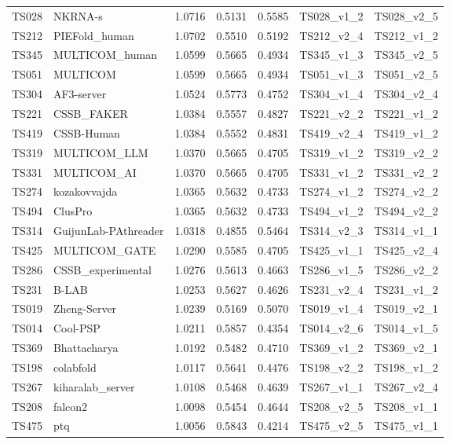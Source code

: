 \begin{table}[ht]
{\begin{tabular}{llrrrll}
TS028 & NKRNA-s & 1.0716 & 0.5131 & 0.5585 & TS028\_v1\_2 & TS028\_v2\_5 \\ 
TS212 & PIEFold\_human & 1.0702 & 0.5510 & 0.5192 & TS212\_v2\_4 & TS212\_v1\_2 \\ 
TS345 & MULTICOM\_human & 1.0599 & 0.5665 & 0.4934 & TS345\_v1\_3 & TS345\_v2\_5 \\ 
TS051 & MULTICOM & 1.0599 & 0.5665 & 0.4934 & TS051\_v1\_3 & TS051\_v2\_5 \\ 
TS304 & AF3-server & 1.0524 & 0.5773 & 0.4752 & TS304\_v1\_4 & TS304\_v2\_4 \\ 
TS221 & CSSB\_FAKER & 1.0384 & 0.5557 & 0.4827 & TS221\_v2\_2 & TS221\_v1\_2 \\ 
TS419 & CSSB-Human & 1.0384 & 0.5552 & 0.4831 & TS419\_v2\_4 & TS419\_v1\_2 \\ 
TS319 & MULTICOM\_LLM & 1.0370 & 0.5665 & 0.4705 & TS319\_v1\_2 & TS319\_v2\_2 \\ 
TS331 & MULTICOM\_AI & 1.0370 & 0.5665 & 0.4705 & TS331\_v1\_2 & TS331\_v2\_2 \\ 
TS274 & kozakovvajda & 1.0365 & 0.5632 & 0.4733 & TS274\_v1\_2 & TS274\_v2\_2 \\ 
TS494 & ClusPro & 1.0365 & 0.5632 & 0.4733 & TS494\_v1\_2 & TS494\_v2\_2 \\ 
TS314 & GuijunLab-PAthreader & 1.0318 & 0.4855 & 0.5464 & TS314\_v2\_3 & TS314\_v1\_1 \\ 
TS425 & MULTICOM\_GATE & 1.0290 & 0.5585 & 0.4705 & TS425\_v1\_1 & TS425\_v2\_4 \\ 
TS286 & CSSB\_experimental & 1.0276 & 0.5613 & 0.4663 & TS286\_v1\_5 & TS286\_v2\_2 \\ 
TS231 & B-LAB & 1.0253 & 0.5627 & 0.4626 & TS231\_v2\_4 & TS231\_v1\_2 \\ 
TS019 & Zheng-Server & 1.0239 & 0.5169 & 0.5070 & TS019\_v1\_4 & TS019\_v2\_1 \\ 
TS014 & Cool-PSP & 1.0211 & 0.5857 & 0.4354 & TS014\_v2\_6 & TS014\_v1\_5 \\ 
TS369 & Bhattacharya & 1.0192 & 0.5482 & 0.4710 & TS369\_v1\_2 & TS369\_v2\_1 \\ 
TS198 & colabfold & 1.0117 & 0.5641 & 0.4476 & TS198\_v2\_2 & TS198\_v1\_2 \\ 
TS267 & kiharalab\_server & 1.0108 & 0.5468 & 0.4639 & TS267\_v1\_1 & TS267\_v2\_4 \\ 
TS208 & falcon2 & 1.0098 & 0.5454 & 0.4644 & TS208\_v2\_5 & TS208\_v1\_1 \\ 
TS475 & ptq & 1.0056 & 0.5843 & 0.4214 & TS475\_v2\_5 & TS475\_v1\_1 \\ 

\end{tabular}}
\end{table}
